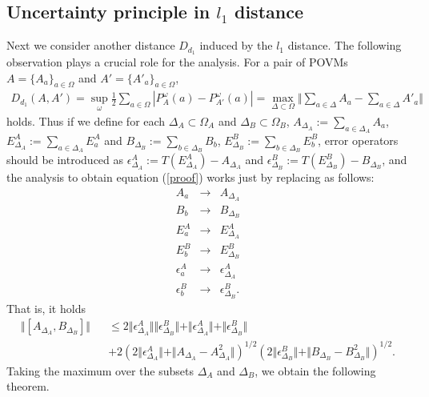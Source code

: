 \documentclass[12pt,showpacs,preprintnumbers,amsmath,amssymb]{revtex4-2}
\begin{document}
\subsection{Uncertainty principle in $l_1$ distance}
Next we consider another distance $D_{d_1}$ induced by 
the $l_1$ distance. 
The following observation \cite{Werner} plays a crucial role 
for the analysis. For a pair of POVMs $A=\{A_a\}_{a\in \Omega}$
and $A'=\{A'_a\}_{a\in \Omega}$,  
\begin{eqnarray*}
D_{d_1}(A,A')=\sup_{\omega}\frac{1}{2}
\sum_{a\in \Omega}
|P^\omega_A(a)-P^\omega_{A'}(a)|
=\max_{\Delta \subset \Omega}
\Vert \sum_{a\in \Delta}A_a
-\sum_{a\in \Delta}A'_a\Vert
\end{eqnarray*}
holds. Thus if we define for each $\Delta_A \subset \Omega_A$ 
and $\Delta_B \subset \Omega_B$, 
$A_{\Delta_A}:=\sum_{a\in \Delta_A}A_a$, 
$E^A_{\Delta_A}:=\sum_{a\in \Delta_A}E^A_a$
 and 
$B_{\Delta_B}:=\sum_{b\in \Delta_B}B_b$, 
$E^B_{\Delta_B}:=\sum_{b\in \Delta_B}E^B_b$, 
error operators should be introduced as
$\epsilon^A_{\Delta_A}:=T(E^A_{\Delta_A})-A_{\Delta_A}$
and $\epsilon^B_{\Delta_B}:=T(E^B_{\Delta_B})-
B_{\Delta_B}$, and the analysis to obtain 
equation (\ref{proof})
works 
just by replacing as follows:
\begin{eqnarray*}
A_a &\to& A_{\Delta_A} \\
B_b &\to& B_{\Delta_B} \\
E^A_a &\to& E^A_{\Delta_A}\\
E^B_b &\to& E^B_{\Delta_B} \\
\epsilon^A_a &\to& \epsilon^A_{\Delta_A}\\
\epsilon^B_b &\to& \epsilon^B_{\Delta_B}.
\end{eqnarray*}
That is, it holds
\begin{eqnarray*}
\Vert [A_{\Delta_A},B_{\Delta_B}]
\Vert &&
\leq 2\Vert \epsilon^A_{\Delta_A}
 \Vert \Vert \epsilon^B_{\Delta_B} \Vert 
+\Vert \epsilon^A_{\Delta_A} \Vert +\Vert \epsilon^B_{\Delta_B}
 \Vert 
\\
&&
+2(2\Vert \epsilon^A_{\Delta_A}
\Vert +\Vert A_{\Delta_A}-A_{\Delta_A}^2\Vert
)^{1/2}
(2\Vert \epsilon^B_{\Delta_B}\Vert +\Vert B_{\Delta_B}
-B_{\Delta_B}^2\Vert
)^{1/2}.
\end{eqnarray*}
Taking the maximum over the subsets $\Delta_A$ and $\Delta_B$, 
we obtain the following theorem.
\end{document}
